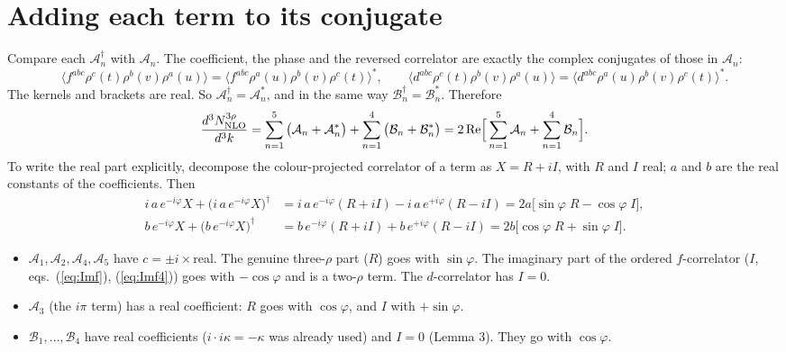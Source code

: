 \documentclass[10pt]{article}
\begin{document}
\section{Adding each term to its conjugate}
Compare each $\mathcal{A}_{n}^{\dagger}$ with $\mathcal{A}_{n}$. The coefficient, the phase and the reversed correlator are exactly the complex conjugates of those in $\mathcal{A}_{n}$:
\begin{equation}
\big\langle f^{abc}\rho^{c}(t)\rho^{b}(v)\rho^{a}(u)\big\rangle=\big\langle f^{abc}\rho^{a}(u)\rho^{b}(v)\rho^{c}(t)\big\rangle^{*},\qquad\big\langle d^{abc}\rho^{c}(t)\rho^{b}(v)\rho^{a}(u)\big\rangle=\big\langle d^{abc}\rho^{a}(u)\rho^{b}(v)\rho^{c}(t)\big\rangle^{*}.
\end{equation}
The kernels and brackets are real. So $\mathcal{A}_{n}^{\dagger}=\mathcal{A}_{n}^{*}$, and in the same way $\mathcal{B}_{n}^{\dagger}=\mathcal{B}_{n}^{*}$. Therefore
\begin{equation}
\frac{d^{3}N^{3\rho}_{\rm NLO}}{d^{3}k}=\sum_{n=1}^{5}\big(\mathcal{A}_{n}+\mathcal{A}_{n}^{*}\big)+\sum_{n=1}^{4}\big(\mathcal{B}_{n}+\mathcal{B}_{n}^{*}\big)=2\,{\rm Re}\Big[\sum_{n=1}^{5}\mathcal{A}_{n}+\sum_{n=1}^{4}\mathcal{B}_{n}\Big].
\end{equation}
To write the real part explicitly, decompose the colour-projected correlator of a term as $X=R+iI$, with $R$ and $I$ real; $a$ and $b$ are the real constants of the coefficients. Then
\begin{align}
i\,a\,e^{-i\varphi}X+\big(i\,a\,e^{-i\varphi}X\big)^{\dagger}&=i\,a\,e^{-i\varphi}(R+iI)-i\,a\,e^{+i\varphi}(R-iI)=2a\big[\sin\varphi\;R-\cos\varphi\;I\big],\label{eq:rule-i}\\
b\,e^{-i\varphi}X+\big(b\,e^{-i\varphi}X\big)^{\dagger}&=b\,e^{-i\varphi}(R+iI)+b\,e^{+i\varphi}(R-iI)=2b\big[\cos\varphi\;R+\sin\varphi\;I\big].\label{eq:rule-r}
\end{align}
\begin{itemize}
\item $\mathcal{A}_{1},\mathcal{A}_{2},\mathcal{A}_{4},\mathcal{A}_{5}$ have $c=\pm i\times$real. The genuine three-$\rho$ part ($R$) goes with $\sin\varphi$. The imaginary part of the ordered $f$-correlator ($I$, eqs.~(\ref{eq:Imf}), (\ref{eq:Imf4})) goes with $-\cos\varphi$ and is a two-$\rho$ term. The $d$-correlator has $I=0$.
\item $\mathcal{A}_{3}$ (the $i\pi$ term) has a real coefficient: $R$ goes with $\cos\varphi$, and $I$ with $+\sin\varphi$.
\item $\mathcal{B}_{1},\dots,\mathcal{B}_{4}$ have real coefficients ($i\cdot i\kappa=-\kappa$ was already used) and $I=0$ (Lemma 3). They go with $\cos\varphi$.
\end{itemize}
\end{document}
